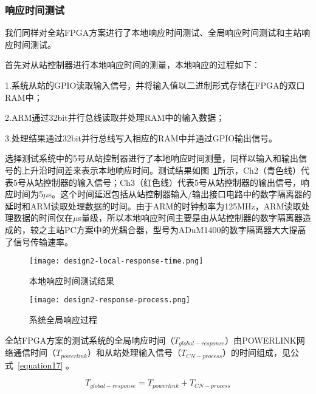 \subsubsection{响应时间测试}
\label{subsubsection:全FPGA方案的响应时间测试}
我们同样对全站FPGA方案进行了本地响应时间测试、全局响应时间测试和主站响应时间测试。

首先对从站控制器进行本地响应时间的测量，本地响应的过程如下：

1.系统从站的GPIO读取输入信号，并将输入值以二进制形式存储在FPGA的双口RAM中；

2.ARM通过32bit并行总线读取并处理RAM中的输入数据；

3.处理结果通过32bit并行总线写入相应的RAM中并通过GPIO输出信号。

选择测试系统中的5号从站控制器进行了本地响应时间测量，同样以输入和输出信号的上升沿时间差来表示本地响应时间。测试结果如图~\ref{fig:design2-local-response-time}所示，Ch2（青色线）代表5号从站控制器的输入信号；Ch3（红色线）代表5号从站控制器的输出信号，响应时间为5$\mu$s。这个时间延迟包括从站控制器输入/输出接口电路中的数字隔离器的延时和ARM读取处理数据的时间。由于ARM的时钟频率为125MHz，ARM读取处理数据的时间仅在$\mu$s量级，所以本地响应时间主要是由从站控制器的数字隔离器造成的，较之主站PC方案中的光耦合器，型号为ADuM1400的数字隔离器大大提高了信号传输速率。

\begin{figure}[!htb]
  \centering
  \texttt{[image: design2-local-response-time.png]}
  \caption{本地响应时间测试结果}
  \label{fig:design2-local-response-time}
\end{figure}

\begin{figure}[!htb]
  \centering
  \texttt{[image: design2-response-process.png]}
  \caption{系统全局响应过程}
  \label{fig:design2-response-process}
\end{figure}

全站FPGA方案的测试系统的全局响应时间（$T_{global-response}$）由POWERLINK网络通信时间（$T_{powerlink}$）和从站处理输入信号（$T_{CN-process}$）的时间组成，见公式~\ref{equation17} 。

\begin{equation}
\label{equation17}
T_{global-response}=T_{powerlink}+T_{CN-process}
\end{equation}

